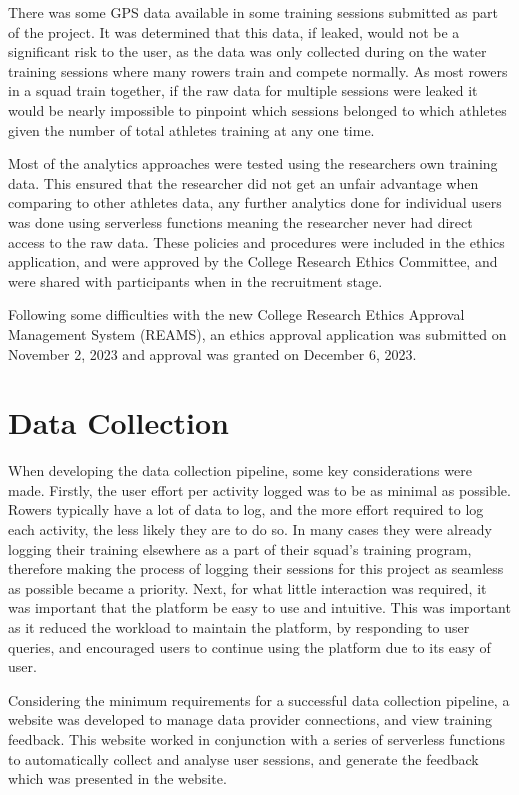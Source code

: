 There was some GPS data available in some training sessions submitted as part of the project. It was determined that this data, if leaked, would not be a significant risk to the user, as the data was only collected during on the water training sessions where many rowers train and compete normally. As most rowers in a squad train together, if the raw data for multiple sessions were leaked it would be nearly impossible to pinpoint which sessions belonged to which athletes given the number of total athletes training at any one time. 

Most of the analytics approaches were tested using the researchers own training data. This ensured that the researcher did not get an unfair advantage when comparing to other athletes data, any further analytics done for individual users was done using serverless functions meaning the researcher never had direct access to the raw data. These policies and procedures were included in the ethics application, and were approved by the College Research Ethics Committee, and were shared with participants when in the recruitment stage. 

Following some difficulties with the new College Research Ethics Approval Management System (REAMS), an ethics approval application was submitted on November 2, 2023 and approval was granted on December 6, 2023.

\section{Data Collection}
When developing the data collection pipeline, some key considerations were made. Firstly, the user effort per activity logged was to be as minimal as possible. Rowers typically have a lot of data to log, and the more effort required to log each activity, the less likely they are to do so. In many cases they were already logging their training elsewhere as a part of their squad's training program, therefore making the process of logging their sessions for this project as seamless as possible became a priority. Next, for what little interaction was required, it was important that the platform be easy to use and intuitive. This was important as it reduced the workload to maintain the platform, by responding to user queries, and encouraged users to continue using the platform due to its easy of user.

Considering the minimum requirements for a successful data collection pipeline, a website was developed to manage data provider connections, and view training feedback. This website worked in conjunction with a series of serverless functions to automatically collect and analyse user sessions, and generate the feedback which was presented in the website.

